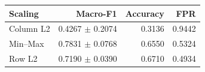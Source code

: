 \begin{tabular}{lrrr}
\toprule
Scaling & Macro-F1 & Accuracy & FPR \\
\midrule
Column L2 & 0.4267 $\pm$ 0.2074 & 0.3136 & 0.9442 \\
Min--Max & 0.7831 $\pm$ 0.0768 & 0.6550 & 0.5324 \\
Row L2 & 0.7190 $\pm$ 0.0390 & 0.6710 & 0.4934 \\
\bottomrule
\end{tabular}
